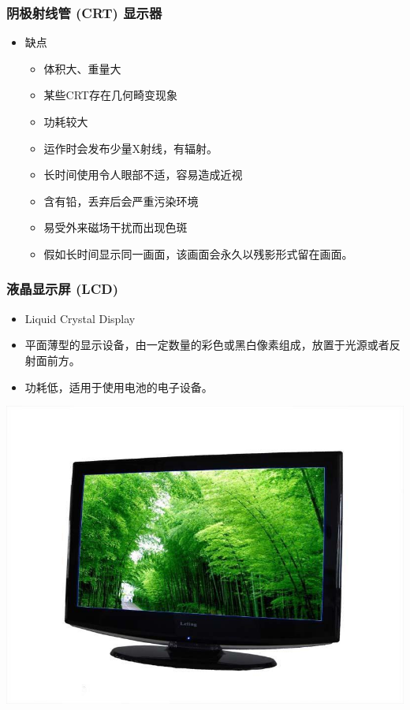 \documentclass{beamer}
\begin{document}
\begin{frame}
	\frametitle{阴极射线管 (CRT) 显示器}
	\begin{itemize}
		\item 缺点
		\begin{itemize}
			\item 体积大、重量大
		    \item 某些CRT存在几何畸变现象
		    \item 功耗较大
		    \item 运作时会发布少量X射线，有辐射。
		    \item 长时间使用令人眼部不适，容易造成近视
		    \item 含有铅，丢弃后会严重污染环境
		    \item 易受外来磁场干扰而出现色斑
		    \item 假如长时间显示同一画面，该画面会永久以残影形式留在画面。
		\end{itemize}
	\end{itemize}
\end{frame}

\begin{frame}
	\frametitle{液晶显示屏 (LCD)}
	\begin{itemize}
		\item Liquid Crystal Display
		\item 平面薄型的显示设备，由一定数量的彩色或黑白像素组成，放置于光源或者反射面前方。
		\item 功耗低，适用于使用电池的电子设备。
	\end{itemize}
	\begin{center}
	\includegraphics[height=.6\textheight]{images/Liquid_Crystal_Display.jpg}
	\end{center}
\end{frame}
\end{document}
